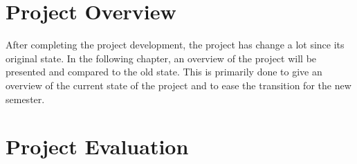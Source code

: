 \chapter{Project Overview}\label{CAP:ProjectOverview}
After completing the project development, the project has change a lot since its original state.
In the following chapter, an overview of the project will be presented and compared to the old state.
This is primarily done to give an overview of the current state of the project and to ease the transition for the new semester.



\chapter{Project Evaluation}\label{CAP:ProjectEvaluation}



